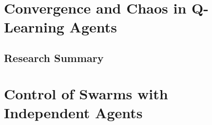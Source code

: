 \documentclass[.../main.tex]{subfiles}
\begin{document}
    \section{Convergence and Chaos in Q-Learning Agents} \label{sec::Chaos_in_Q-Learning}
    \subsection{Research Summary} \label{sec::Research Summary}

    \section{Control of Swarms with Independent Agents} \label{sec::Independent_Swarm_Control}
    
\end{document}
